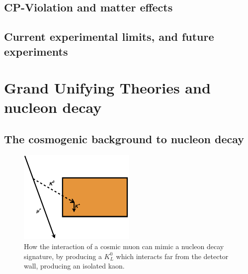 \subsection{CP-Violation and matter effects} \label{Neut_Effects}


\subsection{Current experimental limits, and future experiments} \label{sec:Theory_Exp}


\section{Grand Unifying Theories and nucleon decay}  \label{sec:Theory_GUT} %

\subsection{The cosmogenic background to nucleon decay} \label{sec:BkNDK}  %

\begin{figure}
  \centering
  \includegraphics[width=0.5\textwidth]{KaonNDKInteraction}
  \caption[How the interaction of a cosmic muon can mimic a nucleon decay signature]
          {How the interaction of a cosmic muon can mimic a nucleon decay signature, by producing a $K^{0}_{L}$ which interacts far from the detector wall, producing an isolated kaon.}
  \label{fig:K0LongBackground}
\end{figure}

